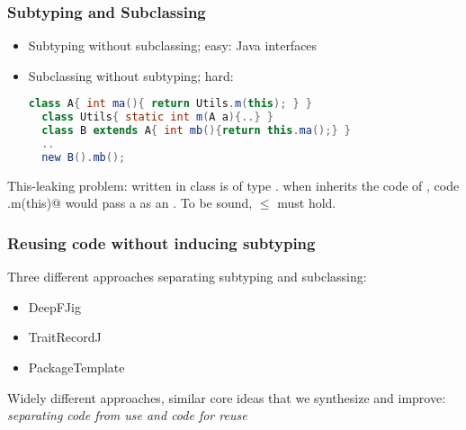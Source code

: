 
\begin{frame}[fragile]
\frametitle{Subtyping and Subclassing}

\begin{itemize}
\item Subtyping without subclassing;
easy: Java interfaces

\item Subclassing without subtyping;
hard:
\begin{lstlisting}[language=Java]
  class A{ int ma(){ return Utils.m(this); } }
  class Utils{ static int m(A a){..} }
  class B extends A{ int mb(){return this.ma();} }
  ..
  new B().mb();
\end{lstlisting}
\end{itemize}


This-leaking problem:
\Q@this@ written in class \Q@A@ is of type \Q@A@.
when \Q@B@ inherits the code of \Q@A@,
code \Q@Uitls.m(this)@ would pass a \Q@this@
as an \Q@A@. To be sound, 
\Q@B@ $\leq$ \Q@A@ must hold. 
\end{frame}



\begin{frame}[fragile]
\frametitle{Reusing code without inducing subtyping}

Three different approaches separating subtyping and subclassing:
\begin{itemize}
\item DeepFJig
\item TraitRecordJ
\item PackageTemplate
\end{itemize}
Widely different approaches,
similar core ideas that we synthesize and improve:
\emph{separating code from use and code for reuse}

\end{frame}


